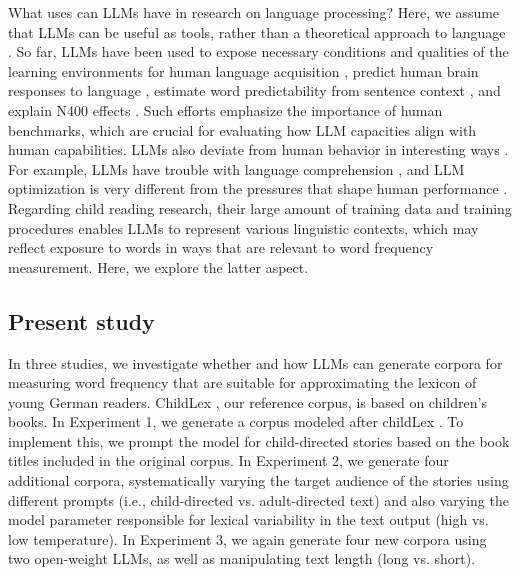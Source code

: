 \documentclass[manuscript]{stjour}
\begin{document}

What uses can LLMs have in research on language processing? Here, we assume that LLMs can be useful as tools, rather than a theoretical approach to language \citep[e.g., as in][]{binz2024centaur}. So far, LLMs have been used to expose necessary conditions and qualities of the learning environments for human language acquisition \citep{warstadt_findings_2023, trott_large_2023}, predict human brain responses to language \citep{tuckute_driving_2024}, estimate word predictability from sentence context \citep{hofmann_language_2022, chandra_synthetic_2023, heilbron_prediction_2021}, and explain N400 effects \citep{michaelov_strong_2024}. Such efforts emphasize the importance of human benchmarks, which are crucial for evaluating how LLM capacities align with human capabilities. LLMs also deviate from human behavior in interesting ways \citep{mahowald_dissociating_2024}. For example, LLMs have trouble with language comprehension \citep{Dentella_2024}, and LLM optimization is very different from the pressures that shape human performance \citep{mccoy_embers_2023}. Regarding child reading research, their large amount of training data and training procedures enables LLMs to represent various linguistic contexts, which may reflect exposure to words in ways that are relevant to word frequency measurement. Here, we explore the latter aspect. 

\subsection*{Present study}

In three studies, we investigate whether and how LLMs can generate corpora for measuring word frequency that are suitable for approximating the lexicon of young German readers. ChildLex \citep{schroeder_childlex_2015}, our reference corpus, is based on children's books. In Experiment 1, we generate a corpus modeled after childLex \citep{schroeder_childlex_2015}. To implement this, we prompt the model for child-directed stories based on the book titles included in the original corpus. In Experiment 2, we generate four additional corpora, systematically varying the target audience of the stories using different prompts (i.e., child-directed vs. adult-directed text) and also varying the model parameter responsible for lexical variability in the text output (high vs. low temperature). In Experiment 3, we again generate four new corpora using two open-weight LLMs, as well as manipulating text length (long vs. short). 
\end{document}
